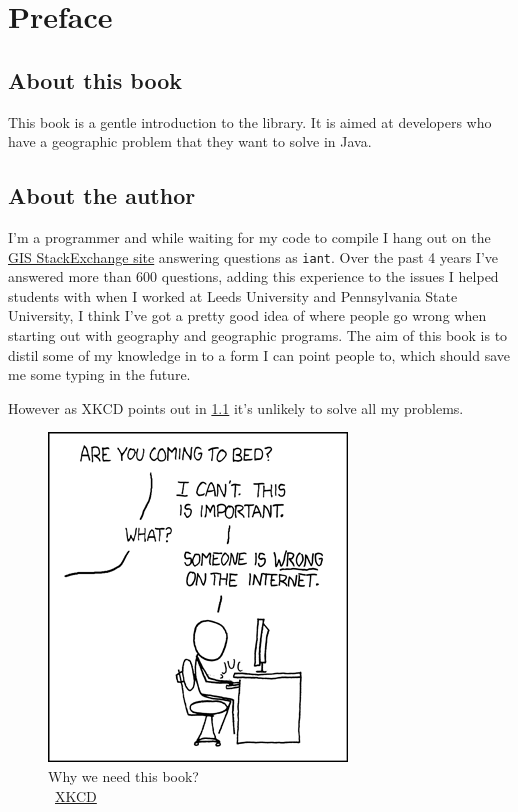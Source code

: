 \chapter{Preface}
\section{About this book}
This book is a gentle introduction to the \GeoTools library. It is aimed at developers who have a geographic problem that they want to solve in Java. 

\section{About the author}
I'm a programmer and while waiting for my code to compile I hang out on the \href{http://gis.stackexchange.com/}{GIS StackExchange site} answering questions as \texttt{iant}. Over the past 4 years I've answered more than 600 questions, adding this experience to the issues I helped students with when I worked at Leeds University and Pennsylvania State University, I think I've got a pretty good idea of where people go wrong when starting out with geography and geographic programs. The aim of this book is to distil some of my knowledge in to a form I can point people to, which should save me some typing in the future. 

However as XKCD points out in \cref{xkcd-duty} it's unlikely to solve all my problems. 


\begin{figure}[htbp]
{\centering
\includegraphics{images/duty_calls}
\caption{Why we need this book?\\ \ccbync~\href{http://xkcd.com/386/}{XKCD}}
\label{xkcd-duty}
}
\end{figure}

